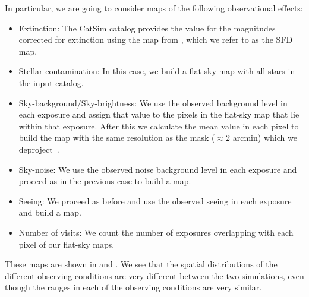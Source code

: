 \documentclass[a4paper,fleqn,usenatbib]{mnras}
\begin{document}
In particular, we are going to consider maps of the following observational effects:
\begin{itemize}
\item Extinction: The CatSim catalog provides the value for the magnitudes corrected for extinction using the map from \citet{1998ApJ...500..525S}, which we refer to as the SFD map.
\item Stellar contamination: In this case, we build a flat-sky map with all stars in the input catalog.
\item Sky-background/Sky-brightness: We use the observed background level in each exposure and assign that value to the pixels in the flat-sky map that lie within that exposure. After this we calculate the mean value in each pixel to build the map with the same resolution as the mask ($\approx 2$ arcmin) which we deproject~\citep{2019MNRAS.484.4127A}. 
\item Sky-noise: We use the observed noise background level in each exposure and proceed as in the previous case to build a map.
\item Seeing: We proceed as before and use the observed seeing in each exposure and build a map.
\item Number of visits: We count the number of exposures overlapping with each pixel of our flat-sky maps.
\end{itemize}
These maps are shown in  and . We see that the spatial distributions of the different observing conditions are very different between the two simulations, even though the ranges in each of the observing conditions are very similar. 
\end{document}
